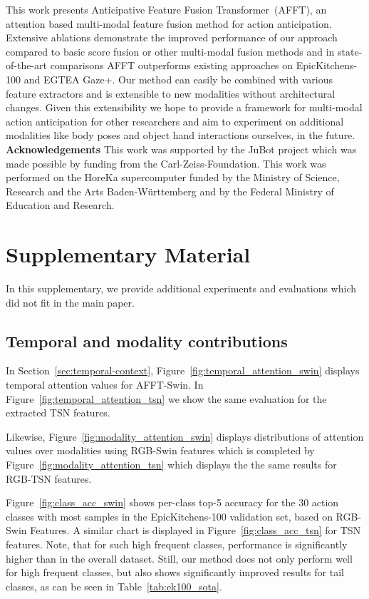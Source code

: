 \documentclass[10pt,twocolumn,letterpaper,dvipsnames]{article}
\newcommand{\sname}{AFFT}
\newcommand{\lname}{Anticipative Feature Fusion Transformer}
\newcommand{\lsname}{\lname\ (\sname)}
\begin{document}
This work presents \lsname, an attention based multi-modal feature fusion method for action anticipation. Extensive ablations demonstrate the improved performance of our approach compared to basic score fusion or other multi-modal fusion methods and in state-of-the-art comparisons AFFT outperforms existing approaches on EpicKitchens-100 and EGTEA Gaze+. Our method can easily be combined with various feature extractors and is extensible to new modalities without architectural changes. Given this extensibility we hope to provide a framework for multi-modal action anticipation for other researchers and aim to experiment on additional modalities like body poses and object hand interactions ourselves, in the future. 
\textbf{Acknowledgements} This work was supported by the JuBot project which was made possible by funding from the Carl-Zeiss-Foundation. This work was performed on the HoreKa supercomputer funded by the Ministry of Science, Research and the Arts Baden-Württemberg and by the Federal Ministry of Education and Research.

{\small


}

\clearpage
\section*{Supplementary Material}
\renewcommand\thesubsection{\Alph{subsection}}
\renewcommand{\theequation}{S\arabic{equation}}
\renewcommand{\thefigure}{S\arabic{figure}}
\renewcommand{\thetable}{S\arabic{table}}
In this supplementary, we provide additional experiments and evaluations which did not fit in the main paper.

\subsection{Temporal and modality contributions}
In Section~\ref{sec:temporal-context}, Figure~\ref{fig:temporal_attention_swin} displays temporal attention values for AFFT-Swin. In Figure~\ref{fig:temporal_attention_tsn} we show the same evaluation for the extracted TSN features. 

Likewise, Figure~\ref{fig:modality_attention_swin} displays distributions of attention values over modalities using RGB-Swin features which is completed by Figure~\ref{fig:modality_attention_tsn} which displays the the same results for RGB-TSN features. 

Figure~\ref{fig:class_acc_swin} shows per-class top-5 accuracy for the 30 action classes with most samples in the EpicKitchens-100 validation set, based on RGB-Swin Features. A similar chart is displayed in Figure~\ref{fig:class_acc_tsn} for TSN features. Note, that for such high frequent classes, performance is significantly higher than in the overall dataset. Still, our method does not only perform well for high frequent classes, but also shows significantly improved results for tail classes, as can be seen in Table~\ref{tab:ek100_sota}.
\end{document}
